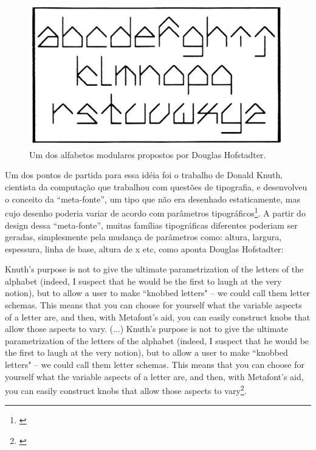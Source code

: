 \begin{figure}
    
        \includegraphics[width=1\linewidth]{pictures/metamagical}
        \vspace{-10pt}
    \caption{Um dos alfabetos modulares propostos por Douglas Hofstadter.}
    \label{fig:metamagical}
\end{figure} 

Um dos pontos de partida para essa idéia foi o trabalho de Donald Knuth, cientista da computação que trabalhou com questões de tipografia, e desenvolveu o conceito da ``meta-fonte'', um tipo que não era desenhado estaticamente, mas cujo desenho poderia variar de acordo com parâmetros tipográficos\footnote{\cite{knuth-meta-font_1982}}. A partir do design dessa ``meta-fonte'', muitas famílias tipográficas diferentes poderiam ser geradas, simplesmente pela mudança de parâmetros como: altura, largura, espessura, linha de base, altura de x etc, como aponta Douglas Hofstadter: 

\begin{citacao}{}
Knuth's purpose is not to give the ultimate parametrization of the letters of the alphabet (indeed, I suspect that he would be the first to laugh at the very notion), but to allow a user to make ``knobbed letters" -- we could call them letter schemas. This means that you can choose for yourself what the variable aspects of a letter are, and then, with Metafont's aid, you can easily construct knobs that allow those aspects to vary. 
(...)
Knuth's purpose is not to give the ultimate parametrization of the letters of the alphabet (indeed, I suspect that he would be the first to laugh at the very notion), but to allow a user to make ``knobbed letters" -- we could call them letter schemas. This means that you can choose for yourself what the variable aspects of a letter are, and then, with Metafont's aid, you can easily construct knobs that allow those aspects to vary\footnote{\cite{Metamagical1986}}. 
\end{citacao}

